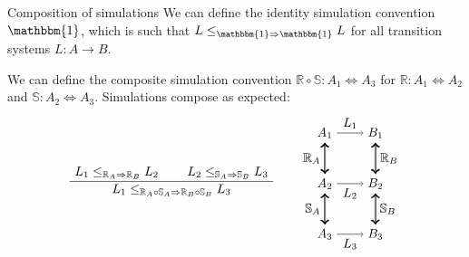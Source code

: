 \documentclass{beamer}
\begin{document}
\begin{frame}{Composition of simulations} %
We can define the identity simulation convention $\mathbbm{1}$,
which is such that $L \le_{\mathbbm{1} \Rightarrow \mathbbm{1}} L$
for all transition systems $L : A \rightarrow B$.

\vspace{1em}
We can define the composite simulation convention
$\mathbb{R} \circ \mathbb{S} : A_1 \Leftrightarrow A_3$ for
$\mathbb{R} : A_1 \Leftrightarrow A_2$ and
$\mathbb{S} : A_2 \Leftrightarrow A_3$.
Simulations compose as expected:
\[
  \AxiomC{$L_1 \le_{\mathbb{R}_A \Rightarrow \mathbb{R}_B} L_2$}
  \AxiomC{$L_2 \le_{\mathbb{S}_A \Rightarrow \mathbb{S}_B} L_3$}
  \BinaryInfC{$L_1 \le_{\mathbb{R}_A \circ \mathbb{S}_A \Rightarrow \mathbb{R}_B \circ \mathbb{S}_B} L_3$}
  \DisplayProof
  \qquad
  \begin{tikzpicture}[baseline,scale=0.7]
    \node (A1) at (-1,  2) {$A_1$};
    \node (A2) at (-1,  0) {$A_2$};
    \node (A3) at (-1, -2) {$A_3$};
    \node (B1) at ( 1,  2) {$B_1$};
    \node (B2) at ( 1,  0) {$B_2$};
    \node (B3) at ( 1, -2) {$B_3$};
    \draw (A1) edge[->] node[auto] {$L_1$} (B1);
    \draw (A2) edge[->] node[auto,swap] {$L_2$} (B2);
    \draw (A3) edge[->] node[auto,swap] {$L_3$} (B3);
    \draw (A1) edge[<->, double] node[auto,swap] {$\mathbb{R}_A$} (A2);
    \draw (B1) edge[<->, double] node[auto] {$\mathbb{R}_B$} (B2);
    \draw (A2) edge[<->, double] node[auto,swap] {$\mathbb{S}_A$} (A3);
    \draw (B2) edge[<->, double] node[auto] {$\mathbb{S}_B$} (B3);
  \end{tikzpicture}
\]
\end{frame}
\end{document}
